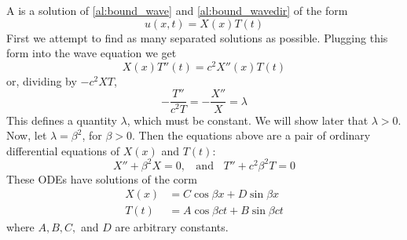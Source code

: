 \documentclass[12pt, a4paper, oneside, openright, titlepage]{book}
\begin{document}
A  is a solution of \ref{al:bound_wave} and \ref{al:bound_wavedir} of the form \begin{equation*}
    u(x,t) = X(x)T(t)
\end{equation*}
First we attempt to find as many separated solutions as possible. Plugging this form into the wave equation we get \begin{equation*}
    X(x)T''(t) = c^2X''(x)T(t)
\end{equation*}
or, dividing by $-c^2XT$, \begin{equation*}
    -\frac{T''}{c^2T} = -\frac{X''}{X} = \lambda
\end{equation*}
This defines a quantity $\lambda$, which must be constant. We will show later that $\lambda > 0$. Now, let $\lambda = \beta^2$, for $\beta > 0$. Then the equations above are a pair of  ordinary differential equations of $X(x)$ and $T(t)$: \begin{equation*}
    X''+\beta^2X = 0,\;\;\text{ and }\;\;T'' + c^2\beta^2T = 0
\end{equation*}
These ODEs have solutions of the corm \begin{align}
    X(x) &= C\cos\beta x + D\sin \beta x \\
    T(t) &= A\cos \beta ct+B\sin\beta ct
\end{align}
where $A,B,C,$ and $D$ are arbitrary constants.
\end{document}
